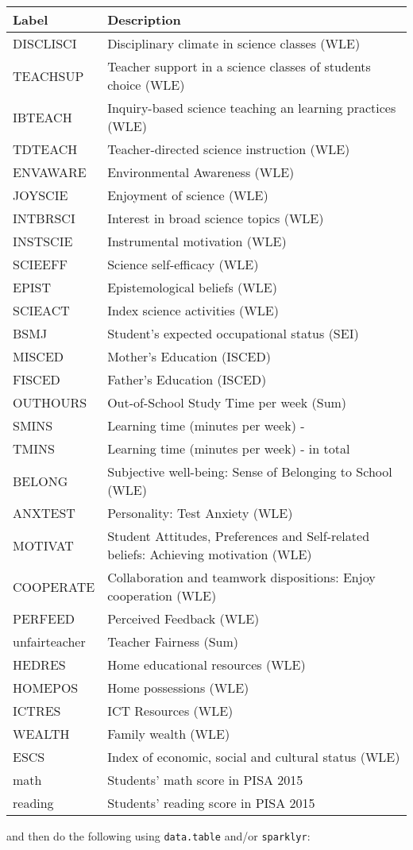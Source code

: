 \documentclass[]{book}
\begin{document}
\begin{longtable}[]{@{}ll@{}}
\toprule
Label & Description\tabularnewline
\midrule
\endhead
DISCLISCI & Disciplinary climate in science classes (WLE)\tabularnewline
TEACHSUP & Teacher support in a science classes of students choice (WLE)\tabularnewline
IBTEACH & Inquiry-based science teaching an learning practices (WLE)\tabularnewline
TDTEACH & Teacher-directed science instruction (WLE)\tabularnewline
ENVAWARE & Environmental Awareness (WLE)\tabularnewline
JOYSCIE & Enjoyment of science (WLE)\tabularnewline
INTBRSCI & Interest in broad science topics (WLE)\tabularnewline
INSTSCIE & Instrumental motivation (WLE)\tabularnewline
SCIEEFF & Science self-efficacy (WLE)\tabularnewline
EPIST & Epistemological beliefs (WLE)\tabularnewline
SCIEACT & Index science activities (WLE)\tabularnewline
BSMJ & Student's expected occupational status (SEI)\tabularnewline
MISCED & Mother's Education (ISCED)\tabularnewline
FISCED & Father's Education (ISCED)\tabularnewline
OUTHOURS & Out-of-School Study Time per week (Sum)\tabularnewline
SMINS & Learning time (minutes per week) - \tabularnewline
TMINS & Learning time (minutes per week) - in total\tabularnewline
BELONG & Subjective well-being: Sense of Belonging to School (WLE)\tabularnewline
ANXTEST & Personality: Test Anxiety (WLE)\tabularnewline
MOTIVAT & Student Attitudes, Preferences and Self-related beliefs: Achieving motivation (WLE)\tabularnewline
COOPERATE & Collaboration and teamwork dispositions: Enjoy cooperation (WLE)\tabularnewline
PERFEED & Perceived Feedback (WLE)\tabularnewline
unfairteacher & Teacher Fairness (Sum)\tabularnewline
HEDRES & Home educational resources (WLE)\tabularnewline
HOMEPOS & Home possessions (WLE)\tabularnewline
ICTRES & ICT Resources (WLE)\tabularnewline
WEALTH & Family wealth (WLE)\tabularnewline
ESCS & Index of economic, social and cultural status (WLE)\tabularnewline
math & Students' math score in PISA 2015\tabularnewline
reading & Students' reading score in PISA 2015\tabularnewline
\bottomrule
\end{longtable}

and then do the following using \texttt{data.table} and/or \texttt{sparklyr}:
\end{document}
